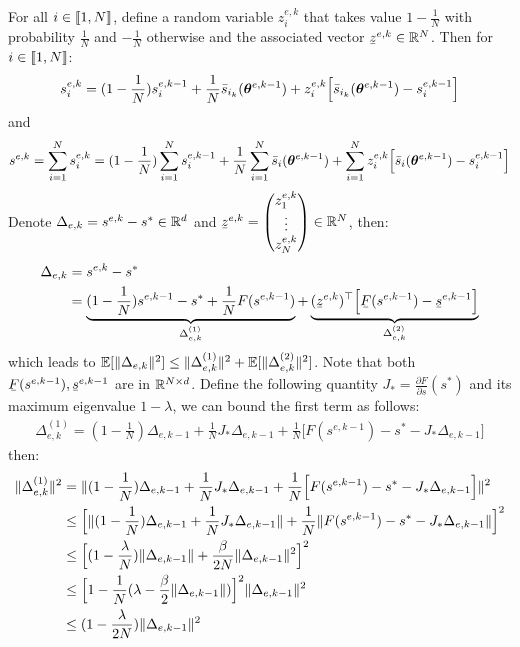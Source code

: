 For all $i \in \llbracket1,N\rrbracket$, define a random variable $z_i^{e,k}$ that takes value $1-\frac{1}{N}$ with probability $\frac{1}{N}$ and $-\frac{1}{N}$ otherwise and the associated vector $\barbelow{z}^{e,k} \in \rset^N$. Then for $i \in \llbracket1,N\rrbracket$:
\begin{equation}
s_i^{e,k} = (1-\frac{1}{N}) s_i^{e,k-1} + \frac{1}{N}\bar{s}_{i_k}(\bm{\theta}^{e,k-1}) + z_i^{e,k} \Big[\bar{s}_{i_k}(\bm{\theta}^{e,k-1}) - s_i^{e,k-1}\Big]
\end{equation}
and
\begin{equation}
s^{e,k} =  \sum_{i=1}^N s_i^{e,k} = (1-\frac{1}{N})  \sum_{i=1}^N s_i^{e,k-1} + \frac{1}{N}  \sum_{i=1}^N \bar{s}_i(\bm{\theta}^{e,k-1}) +  \sum_{i=1}^N z_i^{e,k} \Big[\bar{s}_i(\bm{\theta}^{e,k-1}) - s_i^{e,k-1}\Big]
\end{equation}
Denote $\Delta_{e,k} = s^{e,k} - s^* \in \mathbb{R}^{d}$ and  $\barbelow{z}^{e,k} = \begin{pmatrix} 
z_1^{e,k}  \\
\vdots  \\
z_N^{e,k}
\end{pmatrix} \in \rset^{N}$, then:
\begin{equation}
\begin{split}
\Delta_{e,k} & = s^{e,k} - s^* \\
& = \underbrace{(1-\frac{1}{N}) s^{e,k-1} - s^*  +  \frac{1}{N}  F(s^{e,k-1})}_{\Delta_{e,k}^{(1)}}  + \underbrace{(\barbelow{z}^{e,k})^\top \Big[ \barbelow{F}(s^{e,k-1}) - \barbelow{s}^{e,k-1} \Big]}_{\Delta_{e,k}^{(2)}}
\end{split}
\end{equation}
which leads to $\operatorname*{\mathbb{E}}[\lVert\Delta_{e,k}\rVert^2] \leq \lVert\Delta_{e,k}^{(1)}\rVert^2 + \operatorname*{\mathbb{E}}[\lVert\Delta_{e,k}^{(2)}\rVert^2] $. Note that both $\barbelow{F}(s^{e,k-1}), \barbelow{s}^{e,k-1}$ are in $\mathbb{R}^{N \times d}$.
Define the following quantity $J_* = \frac{\partial F}{\partial s}(s^*)$ and its maximum eigenvalue $1-\lambda$, we can bound the first term as follows:
\begin{equation}
\begin{split}
\Delta_{e,k}^{(1)} = (1-\frac{1}{N})\Delta_{e,k-1} + \frac{1}{N}J_* \Delta_{e,k-1} +  \frac{1}{N} \Big[ F(s^{e,k-1}) - s^* -J_* \Delta_{e,k-1}\Big]
\end{split}
\end{equation}
then:
\begin{equation}
\begin{split}
\lVert\Delta_{e,k}^{(1)}\rVert^2 & = \lVert(1-\frac{1}{N})\Delta_{e,k-1} + \frac{1}{N} J_* \Delta_{e,k-1} +  \frac{1}{N} \Big[ F(s^{e,k-1}) - s^* -J_* \Delta_{e,k-1}\Big]\rVert^2 \\
& \leq \Big[ \lVert(1-\frac{1}{N}) \Delta_{e,k-1} + \frac{1}{N}J_* \Delta_{e,k-1} \rVert + \frac{1}{N} \lVert F(s^{e,k-1}) - s^* -J_* \Delta_{e,k-1}\rVert\Big]^2 \\
& \leq \Big[ (1-\frac{\lambda}{N})\lVert\Delta_{e,k-1}\rVert + \frac{\beta}{2N} \lVert\Delta_{e,k-1}\rVert^2 \Big]^2\\
& \leq \Big[ 1 - \frac{1}{N}(\lambda - \frac{\beta}{2} \lVert\Delta_{e,k-1}\rVert) \Big]^2 \lVert\Delta_{e,k-1}\rVert^2\\
& \leq (1 - \frac{\lambda}{2N})\lVert\Delta_{e,k-1}\rVert^2
\end{split}
\end{equation}

